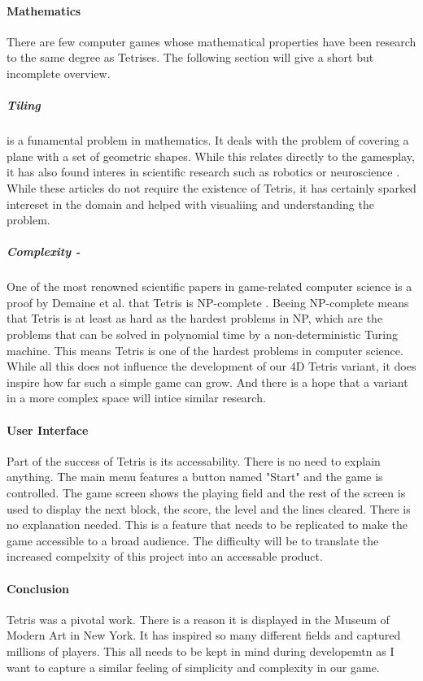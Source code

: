 \documentclass{article}
\begin{document}
\paragraph{Mathematics}
There are few computer games whose mathematical properties have been research to the same degree as Tetrises. The following section will give a short but incomplete overview.
\subparagraph*{Tiling} is a funamental problem in mathematics. It deals with the problem of covering a plane with a set of geometric shapes. While this relates directly to the gamesplay, it has also found interes in scientific research such as robotics \cite{tiling1} or neuroscience \cite{tiling2}. While these articles do not require the existence of Tetris, it has certainly sparked intereset in the domain and helped with visualiing and understanding the problem.
\subparagraph*{Complexity - } One of the most renowned scientific papers in game-related computer science is a proof by Demaine et al. that Tetris is NP-complete \cite{tetris_np}. 
Beeing NP-complete means that Tetris is at least as hard as the hardest problems in NP, which are the problems that can be solved in polynomial time by a non-deterministic Turing machine. This means Tetris is one of the hardest problems in computer science.
\newline
\newline
While all this does not influence the development of our 4D Tetris variant, it does inspire how far such a simple game can grow. And there is a hope that a variant in a more complex space will intice similar research.

\paragraph{User Interface}
Part of the success of Tetris is its accessability. There is no need to explain anything. The main menu features a button named "Start" and the game is controlled. The game screen shows the playing field and the rest of the screen is used to display the next block, the score, the level and the lines cleared. 
There is no explanation needed. This is a feature that needs to be replicated to make the game accessible to a broad audience. The difficulty will be to translate the increased compelxity of this project into an accessable product.
\paragraph{Conclusion}
Tetris was a pivotal work. There is a reason it is displayed in the Museum of Modern Art in New York. It has inspired so many different fields and captured millions of players. This all needs to be kept in mind during developemtn as I want to capture a similar feeling of simplicity and complexity in our game.
\end{document}
